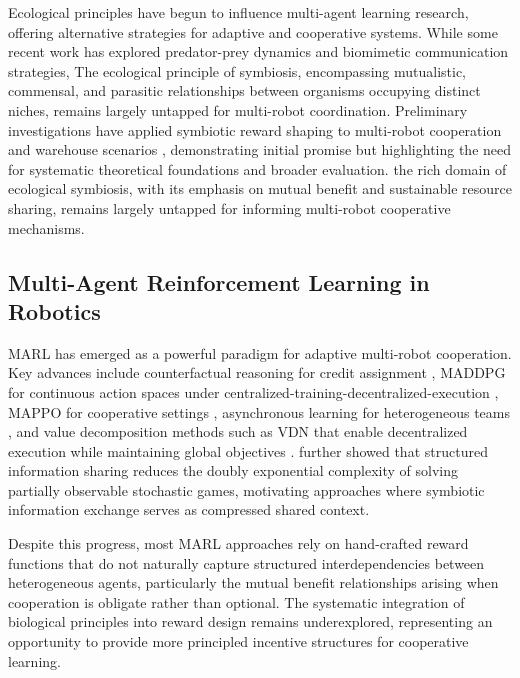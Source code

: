 \documentclass[Afour,sageh,times]{sagej}
\begin{document}
Ecological principles have begun to influence multi-agent learning research, offering alternative strategies for adaptive and cooperative systems. While some recent work has explored predator-prey dynamics and biomimetic communication strategies, The ecological principle of symbiosis, encompassing mutualistic, commensal, and parasitic relationships between organisms occupying distinct niches, remains largely untapped for multi-robot coordination. Preliminary investigations have applied symbiotic reward shaping to multi-robot cooperation \citep{niu2025Investigating} and warehouse scenarios \citep{niu2025Enabling}, demonstrating initial promise but highlighting the need for systematic theoretical foundations and broader evaluation. the rich domain of ecological symbiosis, with its emphasis on mutual benefit and sustainable resource sharing, remains largely untapped for informing multi-robot cooperative mechanisms.

\subsection{Multi-Agent Reinforcement Learning in Robotics}
MARL has emerged as a powerful paradigm for adaptive multi-robot cooperation. Key advances include counterfactual reasoning for credit assignment \citep{foerster2018Counterfactuala}, MADDPG for continuous action spaces under centralized-training-decentralized-execution \citep{lowe2017Multiagent}, MAPPO for cooperative settings \citep{yu2022Surprising}, asynchronous learning for heterogeneous teams \citep{zhang2024Heterogeneous}, and value decomposition methods such as VDN that enable decentralized execution while maintaining global objectives \citep{sunehag2018valuedecomposition}. \citet{liu2023Partially} further showed that structured information sharing reduces the doubly exponential complexity of solving partially observable stochastic games, motivating approaches where symbiotic information exchange serves as compressed shared context.

Despite this progress, most MARL approaches rely on hand-crafted reward functions that do not naturally capture structured interdependencies between heterogeneous agents,  particularly the mutual benefit relationships arising when cooperation is obligate rather than optional. The systematic integration of biological principles into reward design remains underexplored, representing an opportunity to provide more principled incentive structures for cooperative learning.
\end{document}
